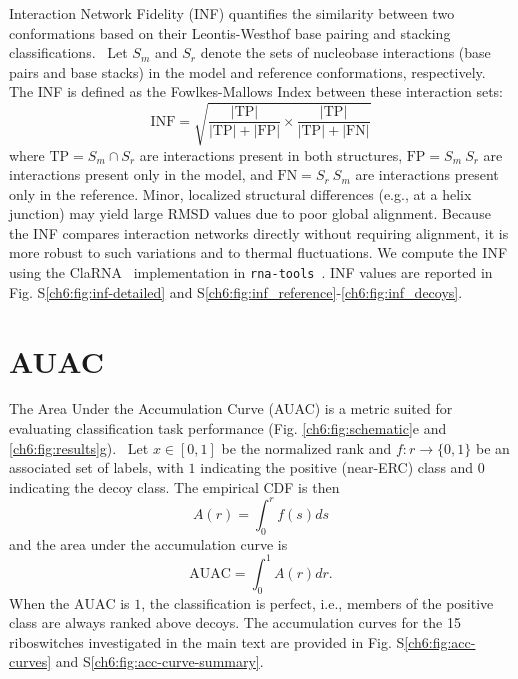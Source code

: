 Interaction Network Fidelity (INF) quantifies the similarity between two conformations based on their Leontis-Westhof base pairing and stacking classifications.~\cite{parisien2009new,leontis2001geometric} Let $S_m$ and $S_r$ denote the sets of nucleobase interactions (base pairs and base stacks) in the model and reference conformations, respectively. The INF is defined as the Fowlkes-Mallows Index between these interaction sets:
\begin{equation}
\mathrm{INF} = \sqrt{\frac{|\mathrm{TP}|}{|\mathrm{TP}|+|\mathrm{FP}|}\times \frac{|\mathrm{TP}|}{|\mathrm{TP}|+|\mathrm{FN}|}}
\end{equation}
where $\mathrm{TP} = S_m \cap S_r$ are interactions present in both structures, $\mathrm{FP} = S_m \ S_r$ are interactions present only in the model, and $\mathrm{FN} = S_r \ S_m$ are interactions present only in the reference. Minor, localized structural differences (e.g., at a helix junction) may yield large RMSD values due to poor global alignment. Because the INF compares interaction networks directly without requiring alignment, it is more robust to such variations and to thermal fluctuations. We compute the INF using the ClaRNA~\cite{walen2014clarna} implementation in \texttt{rna-tools}~\cite{magnus2020rna}. INF values are reported in Fig. S\ref{ch6:fig:inf-detailed} and S\ref{ch6:fig:inf_reference}-\ref{ch6:fig:inf_decoys}.

\section{AUAC}
       {}
\label{ch6:methods:auac}
The Area Under the Accumulation Curve (AUAC) is a metric suited for evaluating classification task performance (Fig. \ref{ch6:fig:schematic}e and \ref{ch6:fig:results}g).~\cite{truchon2007bedroc} Let $x\in [0,1]$ be the normalized rank and $f:r \rightarrow \{0,1\}$ be an associated set of labels, with $1$ indicating the positive (near-ERC) class and $0$ indicating the decoy class. The empirical CDF is then
\begin{equation}
    A(r) = \int_0^r f(s)ds
\end{equation}
and the area under the accumulation curve is
\begin{equation}
    \label{ch6:eq:auac}
    \mathrm{AUAC} = \int_0^1 A(r)dr.
\end{equation}
When the $\mathrm{AUAC}$ is $1$, the classification is perfect, i.e., members of the positive class are always ranked above decoys. The accumulation curves for the 15 riboswitches investigated in the main text are provided in Fig. S\ref{ch6:fig:acc-curves} and S\ref{ch6:fig:acc-curve-summary}.

